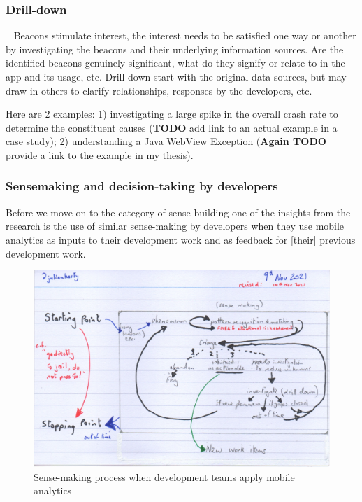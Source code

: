 

\subsubsection{Drill-down}~\label{drill-down-research-method}
Beacons stimulate interest, the interest needs to be satisfied one way or another by investigating the beacons and their underlying information sources. 
Are the identified beacons genuinely significant, what do they signify or relate to in the app and its usage, etc.  Drill-down start with the original data sources, but may draw in others to clarify relationships, responses by the developers, etc.

 

Here are 2 examples: 1) investigating a large spike in the overall crash rate to determine the constituent causes (\textbf{TODO} add link to an actual example in a case study); 2) understanding a Java WebView Exception (\textbf{Again TODO} provide a link to the example in my thesis). 


\subsubsection{Sensemaking and decision-taking by developers}
Before we move on to the category of sense-building one of the insights from the research is the use of similar sense-making by developers when they use mobile analytics as inputs to their development work and as feedback for [their] previous development work.

\begin{figure}
    \centering
    \includegraphics[width=15cm]{images/rough-sketches/practical-sense-making-process-10-nov-2021.jpeg}
    \caption{Sense-making process when development teams apply mobile analytics}
    \label{fig:practical-sense-making-process-when-dev-teams-apply-mobile-analytics}
\end{figure}


